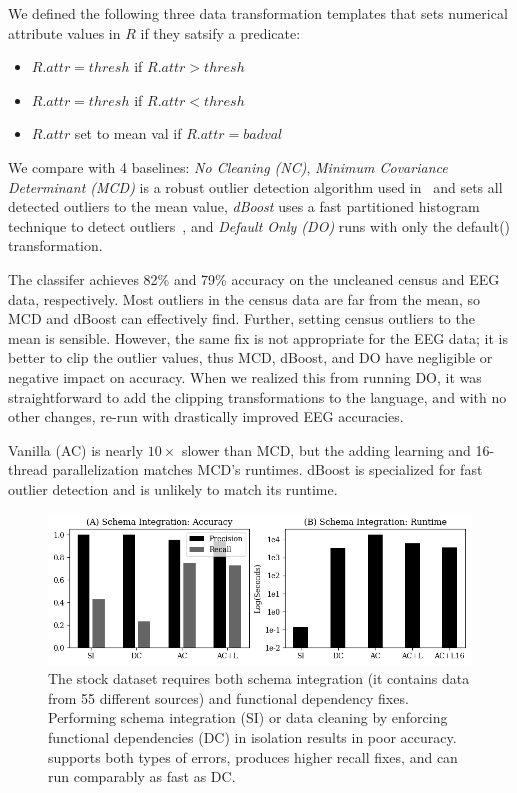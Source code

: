 We defined the following three data transformation templates that sets numerical attribute values in $R$ if they satsify a predicate:

{\small
\begin{itemize}[leftmargin=*, topsep=0mm, itemsep=0mm]
  \item {} $R.attr = thresh$ if $R.attr>thresh$
  \item {} $R.attr = thresh$ if $R.attr<thresh$
  \item {} $R.attr$ set to mean val if $R.attr=badval$
\end{itemize}
}

 We compare with 4 baselines: {\it No Cleaning (NC)}, {\it Minimum Covariance Determinant (MCD)} is a robust outlier detection algorithm used in~\cite{bailis2016macrobase} and sets all detected outliers to the mean value, {\it dBoost} uses a fast partitioned histogram technique to detect outliers~\cite{mariet2016outlier}, and {\it Default Only (DO)} runs \sys with only the \textsf{default()} transformation.  

 The classifer achieves 82\% and 79\% accuracy on the uncleaned census and EEG data, respectively.  Most outliers in the census data are far from the mean, so MCD and dBoost can effectively find.  Further, setting census outliers to the mean is sensible. However, the same fix is not appropriate for the EEG data; it is better to clip the outlier values, thus MCD, dBoost, and DO have negligible or negative impact on accuracy.  When we realized this from running DO, it was straightforward to add the clipping transformations to the language, and with no other changes, re-run \sys with drastically improved EEG accuracies.  

Vanilla \sys (AC) is nearly $10\times$ slower than MCD, but the adding learning and 16-thread parallelization  matches MCD's runtimes.  dBoost is specialized for fast outlier detection and \sys is unlikely to match its runtime.  


\begin{figure}
    \centering
    \includegraphics[width=\columnwidth]{exp/exp3.png}
    \caption{The stock dataset requires both schema integration (it contains data from 55 different sources) and functional dependency fixes.  Performing schema integration (SI) or data cleaning by enforcing functional dependencies (DC) in isolation results in poor accuracy.  \sys supports both types of errors, produces higher recall fixes, and can run comparably as fast as DC.  \label{exp3a}}
\end{figure}


